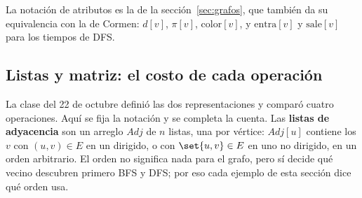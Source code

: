 \documentclass[11pt,letterpaper]{article}
\begin{document}
\newcommand{\busqListaAdy}[3]{%
  \node[anchor=east, font=\small] at (-0.3, #1) {#2};
  \node[draw=gray!80!black, fill=fondoIdea, minimum size=0.5cm,
        inner sep=0pt] at (0, #1) {};
  \foreach \busqElem [count=\busqPos] in {#3} {
    \pgfmathsetmacro{\busqX}{0.85 + (\busqPos - 1)*1.25}
    \node[draw=gray!80!black, minimum size=0.5cm, inner sep=0pt,
          font=\small] at (\busqX, #1) {\busqElem};
    \node[draw=gray!80!black, minimum width=0.3cm,
          minimum height=0.5cm, inner sep=0pt]
      at (\busqX + 0.4, #1) {};
    \fill (\busqX - 0.85, #1) circle (1.1pt);
    \draw[->, >=stealth] (\busqX - 0.85, #1) -- (\busqX - 0.25, #1);
    \xdef\busqUltimoX{\busqX}
  }
  \draw (\busqUltimoX + 0.25, #1 - 0.25)
    -- (\busqUltimoX + 0.55, #1 + 0.25);
}
\newcommand{\busqBaseBFS}{%
  \foreach \busqV/\busqX/\busqY in {r/0/1, s/1/1, t/2/1, u/3/1,
                                     v/0/0, w/1/0, x/2/0, y/3/0}
    \coordinate (\busqV) at (\busqX, \busqY);
  \foreach \busqA/\busqB in {r/s, r/v, s/w, w/t, w/x, t/x, t/u, x/u,
                             x/y, u/y}
    \draw[arista] (\busqA) -- (\busqB);
  \foreach \busqV in {r, s, t, u}
    \node[vert, fill=white, label={[nota, text=black]above:$\busqV$}]
      at (\busqV) {$\infty$};
  \foreach \busqV in {v, w, x, y}
    \node[vert, fill=white, label={[nota, text=black]below:$\busqV$}]
      at (\busqV) {$\infty$};
  \node[font=\small] at (-0.15, -1.15) {$Q$};
}

La notación de atributos es la de la sección~\ref{sec:grafos}, que
también da su equivalencia con la de Cormen: $d[v]$, $\pi[v]$,
$\text{color}[v]$, y $\text{entra}[v]$ y $\text{sale}[v]$ para los
tiempos de DFS.


\subsection*{Listas y matriz: el costo de cada operación}

La clase del 22 de octubre definió las dos representaciones y comparó
cuatro operaciones. Aquí se fija la notación y se completa la cuenta.
Las \textbf{listas de adyacencia} son un arreglo $\mathit{Adj}$ de $n$
listas, una por vértice: $\mathit{Adj}[u]$ contiene los $v$ con
$(u, v) \in E$ en un dirigido, o con $\set{u, v} \in E$ en uno no
dirigido, en un orden arbitrario. El orden no significa nada para el
grafo, pero sí decide qué vecino descubren primero BFS y DFS; por eso
cada ejemplo de esta sección dice qué orden usa.
\end{document}
